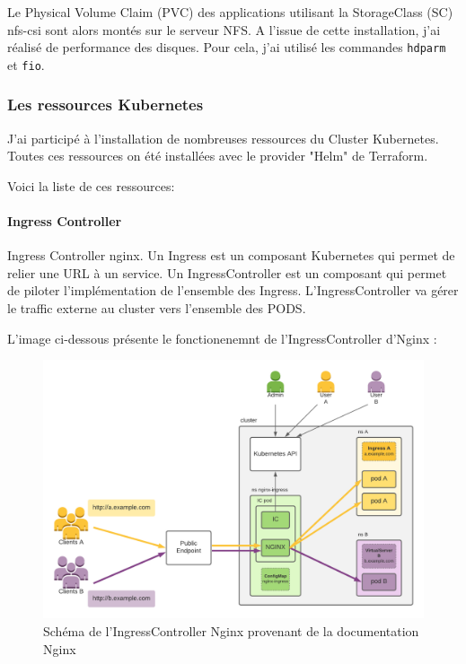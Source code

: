 \documentclass[12pt]{article}
\begin{document}
Le Physical Volume Claim (PVC) des applications utilisant la StorageClass (SC) nfs-csi sont alors montés sur le serveur NFS.
A l'issue de cette installation, j'ai réalisé de performance des disques.
Pour cela, j'ai utilisé les commandes \verb|hdparm| et \verb|fio|.

\subsubsection{Les ressources \gls{Kubernetes}}
J'ai participé à l'installation de nombreuses ressources du Cluster \gls{Kubernetes}.
Toutes ces ressources on été installées avec le provider "Helm" de Terraform.

Voici la liste de ces ressources:
\paragraph{Ingress Controller}
Ingress Controller nginx. Un Ingress est un composant \gls{Kubernetes} qui permet de relier une URL à un service.
Un IngressController est un composant qui permet de piloter l'implémentation de l'ensemble des Ingress.
L'IngressController va gérer le traffic externe au \gls{cluster} vers l'ensemble des PODS.

L'image ci-dessous présente le fonctionenemnt de l'IngressController d'Nginx :

\begin{figure}[!ht]
    \centering
        \includegraphics[width=\textwidth]{src/ic_nginx.png}
    \caption{Schéma de l'IngressController Nginx provenant de la documentation Nginx}
    \label{fig:ic_nginx}
\end{figure}
\end{document}

